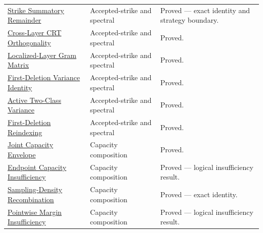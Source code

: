 {\begin{longtable}{>{\raggedright\arraybackslash}p{}>{\raggedright\arraybackslash}p{}>{\raggedright\arraybackslash}p{}}
\href{https://github.com/thiagomata/prime-numbers/blob/master/properties/sieve-sequence/accepted-strike-summatory-coprime-remainder.md}{Strike Summatory Remainder} & Accepted-strike and spectral & Proved --- exact identity and strategy boundary.\\
\href{https://github.com/thiagomata/prime-numbers/blob/master/properties/sieve-sequence/accepted-strike-cross-layer-crt-orthogonality.md}{Cross-Layer CRT Orthogonality} & Accepted-strike and spectral & Proved.\\
\href{https://github.com/thiagomata/prime-numbers/blob/master/properties/sieve-sequence/accepted-strike-localized-layer-gram-matrix.md}{Localized-Layer Gram Matrix} & Accepted-strike and spectral & Proved.\\
\href{https://github.com/thiagomata/prime-numbers/blob/master/properties/sieve-sequence/accepted-strike-first-deletion-variance-identity.md}{First-Deletion Variance Identity} & Accepted-strike and spectral & Proved.\\
\href{https://github.com/thiagomata/prime-numbers/blob/master/properties/sieve-sequence/accepted-strike-active-two-class-variance-identity.md}{Active Two-Class Variance} & Accepted-strike and spectral & Proved.\\
\href{https://github.com/thiagomata/prime-numbers/blob/master/properties/sieve-sequence/accepted-strike-first-deletion-coordinate-reindexing.md}{First-Deletion Reindexing} & Accepted-strike and spectral & Proved.\\
\href{https://github.com/thiagomata/prime-numbers/blob/master/properties/sieve-sequence/endpoint-observable-joint-capacity-envelope.md}{Joint Capacity Envelope} & Capacity composition & Proved.\\
\href{https://github.com/thiagomata/prime-numbers/blob/master/properties/sieve-sequence/endpoint-capacity-cannot-certify-collision-budget.md}{Endpoint Capacity Insufficiency} & Capacity composition & Proved --- logical insufficiency result.\\
\href{https://github.com/thiagomata/prime-numbers/blob/master/properties/sieve-sequence/endpoint-sampling-strike-density-harmful-residue-bridge.md}{Sampling-Density Recombination} & Capacity composition & Proved --- exact identity.\\
\href{https://github.com/thiagomata/prime-numbers/blob/master/properties/sieve-sequence/pointwise-two-class-margin-does-not-imply-collision-budget.md}{Pointwise Margin Insufficiency} & Capacity composition & Proved --- logical insufficiency result.\\

\end{longtable}}
